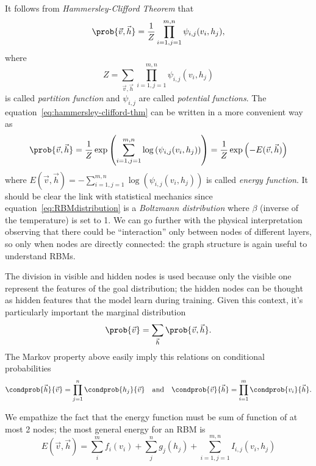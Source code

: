   
  It follows from \emph{Hammersley-Clifford Theorem}\cite{fischer2012introduction} that 
  \begin{equation} \label{eq:hammersley-clifford-thm}
    \prob{\vec{v}, \vec{h}} = \frac{1}{Z} \prod_{i=1,j=1}^{m,n} \psi_{i,j}(v_i, h_j),
  \end{equation}
  where
  \[Z = \sum_{\vec{v}, \vec{h}}\prod_{i=1,j=1}^{m,n} \psi_{i,j}(v_i, h_j)\]
  is called \emph{partition function} and \(\psi_{i,j}\) are called \emph{potential functions}.
  The equation~\eqref{eq:hammersley-clifford-thm} can be written in a more convenient way as
  \begin{equation} \label{eq:RBMdistribution}
    \prob{\vec{v}, \vec{h}} 
      = \frac{1}{Z} \exp\left(\sum_{i=1,j=1}^{m,n}\log\left(\psi_{i,j}(v_i, h_j)\right)\right)
      = \frac{1}{Z} \exp\left(-E(\vec{v}, \vec{h})\right)
  \end{equation}
  where \(E(\vec{v}, \vec{h})=-\sum_{i=1,j=1}^{m,n}\log\left(\psi_{i,j}(v_i, h_j)\right)\) is called
  \emph{energy function}. It should be clear the link with statistical mechanics since equation~\eqref{eq:RBMdistribution}
  is a \emph{Boltzmann distribution} where \(\beta\) (inverse of the temperature) is set to 1. 
  We can go further with the physical interpretation observing that there could be ``interaction''
  only between nodes of different layers, so only when nodes are directly connected: the graph
  structure is again useful to understand RBMs.
  
  The division in visible and hidden nodes is used because only the visible one represent the
  features of the goal distribution; the hidden nodes can be thought as hidden features that
  the model learn during training. Given this context, it's particularly important the marginal
  distribution
  \[\prob{\vec{v}} = \sum_{\vec{h}} \prob{\vec{v},\vec{h}}.\]
  The Markov property above easily imply this relations on conditional probabilities
  \[
    \condprob{\vec{h}}{\vec{v}} = \prod_{j=1}^n \condprob{h_j}{\vec{v}} \quad\text{and}\quad
    \condprob{\vec{v}}{\vec{h}} = \prod_{i=1}^m \condprob{v_i}{\vec{h}}.
  \]
  
  We empathize the fact that the energy function must be sum of function of at most 2 nodes;
  the most general energy for an RBM is
  \begin{equation} \label{eq:energyRBM}
    E(\vec{v}, \vec{h}) = \sum_{i}^m f_i{(v_i)} + \sum_{j}^n g_j{(h_j)} +
                          \sum_{i=1,j=1}^{m,n} I_{i,j}{(v_i,h_j)}
  \end{equation}
  
